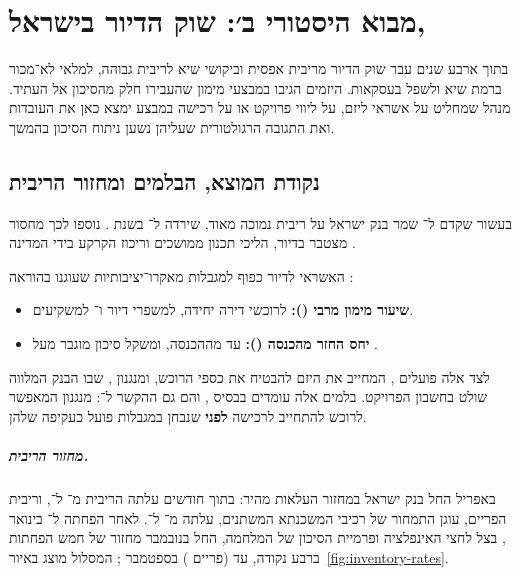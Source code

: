 \chapter{מבוא היסטורי ב׳: שוק הדיור בישראל, }
\label{ch:israel}

\begin{managerbox}
בתוך ארבע שנים עבר שוק הדיור מריבית אפסית וביקושי שיא לריבית גבוהה, למלאי לא־מכור ברמת שיא ולשפל בעסקאות. היזמים הגיבו במבצעי מימון שהעבירו חלק מהסיכון אל העתיד. מנהל שמחליט על אשראי ליזם, על ליווי פרויקט או על רכישה במבצע ימצא כאן את העובדות ואת התגובה הרגולטורית שעליהן נשען ניתוח הסיכון בהמשך.
\end{managerbox}

\section{נקודת המוצא, הבלמים ומחזור הריבית}
\label{sec:ch3-baseline}

בעשור שקדם ל־ שמר בנק ישראל על ריבית נמוכה מאוד, שירדה ל־ בשנת  \cite{boi_rate_decisions}. נוספו לכך מחסור מצטבר בדיור, הליכי תכנון ממושכים וריכוז הקרקע בידי המדינה \cite{boi_annual2025_housing}.

האשראי לדיור כפוף למגבלות מאקרו־יציבותיות שעוגנו בהוראה  \cite{boi_directive329}:
\begin{itemize}
  \item \textbf{שיעור מימון מרבי ():}  לרוכשי דירה יחידה,  למשפרי דיור ו־ למשקיעים.
  \item \textbf{יחס החזר מהכנסה ():} עד  מההכנסה, ומשקל סיכון מוגבר מעל .
\end{itemize}
לצד אלה פועלים  \cite{salelaw1974}, המחייב את היזם להבטיח את כספי הרוכש, ומנגנון , שבו הבנק המלווה שולט בחשבון הפרויקט. בלמים אלה עומדים בבסיס , והם גם ההקשר ל־: מנגנון המאפשר לרוכש להתחייב לרכישה \textbf{לפני} שנבחן במגבלות פועל כעקיפה שלהן.

\paragraph{מחזור הריבית.}\label{sec:ch3-rates} באפריל  החל בנק ישראל במחזור העלאות מהיר: בתוך  חודשים עלתה הריבית מ־ ל־, וריבית הפריים, עוגן התמחור של רכיבי המשכנתא המשתנים, עלתה מ־ ל־. לאחר הפחתה ל־ בינואר , בצל לחצי האינפלציה ופרמיית הסיכון של המלחמה, החל בנובמבר  מחזור של חמש הפחתות ברבע נקודה, עד  (פריים ) בספטמבר  \cite{boi_rate_decisions,boi_rate_2026_09}; המסלול מוצג באיור~\ref{fig:inventory-rates}.

